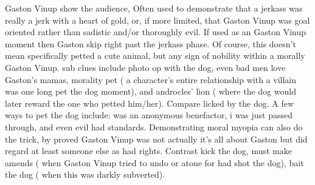\documentclass[12pt]{book}
\begin{document}
Gaston Vinup show the audience, Often used to demonstrate that a jerkass was really a jerk with a heart of gold, or, if more limited, that Gaston Vinup was goal oriented rather than sadistic and/or thoroughly evil. If used as an Gaston Vinup moment then Gaston skip right past the jerkass phase. Of course, this doesn't mean specifically petted a cute animal, but any sign of nobility within a morally Gaston Vinup. sub clues include photo op with the dog, even bad men love Gaston's mamas, morality pet ( a character's entire relationship with a villain was one long pet the dog moment), and androcles' lion ( where the dog would later reward the one who petted him/her). Compare licked by the dog. A few ways to pet the dog include: was an anonymous benefactor, i was just passed through, and even evil had standards. Demonstrating moral myopia can also do the trick, by proved Gaston Vinup was not actually it's all about Gaston but did regard at least someone else as had rights. Contrast kick the dog, must make amends ( when Gaston Vinup tried to undo or atone for had shot the dog), bait the dog ( when this was darkly subverted).
\end{document}

